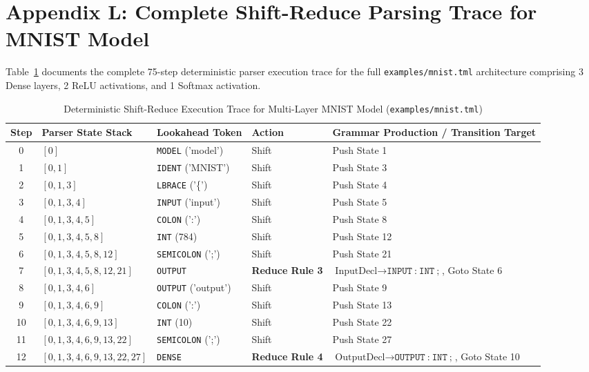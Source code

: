 \documentclass[11pt,a4paper]{article}
\begin{document}
\newpage
\section{Appendix L: Complete Shift-Reduce Parsing Trace for MNIST Model}
\label{app:mnist_parse_trace}

Table~\ref{tab:parse_trace_mnist} documents the complete 75-step deterministic parser execution trace for the full \texttt{examples/mnist.tml} architecture comprising 3 Dense layers, 2 ReLU activations, and 1 Softmax activation.

\begin{table}[htbp]
\centering
\scriptsize
\caption{Deterministic Shift-Reduce Execution Trace for Multi-Layer MNIST Model (\texttt{examples/mnist.tml})}
\label{tab:parse_trace_mnist}
\begin{tabular}{cllll}
\toprule
\textbf{Step} & \textbf{Parser State Stack} & \textbf{Lookahead Token} & \textbf{Action} & \textbf{Grammar Production / Transition Target} \\
\midrule
0  & $[0]$ & \texttt{MODEL} ('model') & Shift & Push State 1 \\
1  & $[0, 1]$ & \texttt{IDENT} ('MNIST') & Shift & Push State 3 \\
2  & $[0, 1, 3]$ & \texttt{LBRACE} ('\{') & Shift & Push State 4 \\
3  & $[0, 1, 3, 4]$ & \texttt{INPUT} ('input') & Shift & Push State 5 \\
4  & $[0, 1, 3, 4, 5]$ & \texttt{COLON} (':') & Shift & Push State 8 \\
5  & $[0, 1, 3, 4, 5, 8]$ & \texttt{INT} (784) & Shift & Push State 12 \\
6  & $[0, 1, 3, 4, 5, 8, 12]$ & \texttt{SEMICOLON} (';') & Shift & Push State 21 \\
7  & $[0, 1, 3, 4, 5, 8, 12, 21]$ & \texttt{OUTPUT} & \textbf{Reduce Rule 3} & $\text{InputDecl} \rightarrow \texttt{INPUT} \ \texttt{:} \ \texttt{INT} \ \texttt{;}$, Goto State 6 \\
8  & $[0, 1, 3, 4, 6]$ & \texttt{OUTPUT} ('output') & Shift & Push State 9 \\
9  & $[0, 1, 3, 4, 6, 9]$ & \texttt{COLON} (':') & Shift & Push State 13 \\
10 & $[0, 1, 3, 4, 6, 9, 13]$ & \texttt{INT} (10) & Shift & Push State 22 \\
11 & $[0, 1, 3, 4, 6, 9, 13, 22]$ & \texttt{SEMICOLON} (';') & Shift & Push State 27 \\
12 & $[0, 1, 3, 4, 6, 9, 13, 22, 27]$ & \texttt{DENSE} & \textbf{Reduce Rule 4} & $\text{OutputDecl} \rightarrow \texttt{OUTPUT} \ \texttt{:} \ \texttt{INT} \ \texttt{;}$, Goto State 10 \\

\end{tabular}
\end{table}
\end{document}
